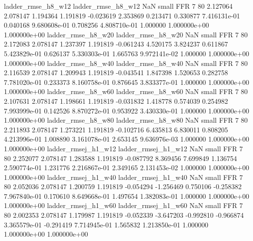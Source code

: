       ladder_rmse_h8_w12       ladder_rmse_h8_w12                   NaN      small      FFR                 7 80 2.127064       2.078147 1.194364       1.191819   -0.023619      2.353869      0.213471     0.330877   7.416131e-01  0.040168 9.680608e-01     0.708256   4.808710e-01            1.000000    1.000000e+00        1.000000e+00
      ladder_rmse_h8_w20       ladder_rmse_h8_w20                   NaN      small      FFR                 7 80 2.172083       2.078147 1.237397       1.191819   -0.061243      4.520175      3.824237     0.611867   5.423829e-01  0.626137 5.330303e-01     1.665763   9.972141e-02            1.000000    1.000000e+00        1.000000e+00
      ladder_rmse_h8_w40       ladder_rmse_h8_w40                   NaN      small      FFR                 7 80 2.116539       2.078147 1.209943       1.191819   -0.043541      1.847398      1.520653     0.282758   7.781020e-01  0.233373 8.160758e-01     0.876645   3.833377e-01            1.000000    1.000000e+00        1.000000e+00
      ladder_rmse_h8_w60       ladder_rmse_h8_w60                   NaN      small      FFR                 7 80 2.107631       2.078147 1.198661       1.191819   -0.031832      1.418778      0.574039     0.254982   7.993999e-01  0.142526 8.870272e-01     0.953922   3.430330e-01            1.000000    1.000000e+00        1.000000e+00
      ladder_rmse_h8_w80       ladder_rmse_h8_w80                   NaN      small      FFR                 7 80 2.211893       2.078147 1.273221       1.191819   -0.102716      6.435813      6.830011     0.808205   4.213996e-01  1.008890 3.161078e-01     2.653145   9.636976e-03            1.000000    1.000000e+00        1.000000e+00
     ladder_rmsej_h1_w12      ladder_rmsej_h1_w12                   NaN      small      FFR                 7 80 2.252077       2.078147 1.283588       1.191819   -0.087792      8.369456      7.699849     1.136754   2.590774e-01  1.231776 2.216867e-01     2.349165   2.131453e-02            1.000000    1.000000e+00        1.000000e+00
     ladder_rmsej_h1_w40      ladder_rmsej_h1_w40                   NaN      small      FFR                 7 80 2.052036       2.078147 1.200759       1.191819   -0.054294     -1.256469      0.750106    -0.258382   7.967840e-01  0.170610 8.649668e-01     1.497654   1.382083e-01            1.000000    1.000000e+00        1.000000e+00
     ladder_rmsej_h1_w60      ladder_rmsej_h1_w60                   NaN      small      FFR                 7 80 2.002353       2.078147 1.179987       1.191819   -0.052339     -3.647203     -0.992810    -0.966874   3.365579e-01 -0.291419 7.714945e-01     1.565832   1.213850e-01            1.000000    1.000000e+00        1.000000e+00
